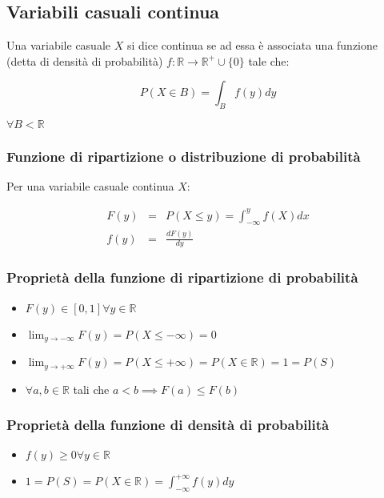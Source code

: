 \documentclass{subfiles}
\begin{document}
\subsection{Variabili casuali continua}

Una variabile casuale $X$ si dice continua se ad essa è associata una funzione (detta di densità di probabilità) $f: \mathbb{R} \to \mathbb{R}^+ \cup \{0\}$ tale che:

$$
P(X \in B) = \int_B f(y)dy
$$

\noindent
$\forall B < \mathbb{R}$

\subsubsection{Funzione di ripartizione o distribuzione di probabilità}

Per una variabile casuale continua $X$:

$$
\begin{matrix}
F(y) &=& P(X \leq y) = \int^y_{-\infty} f(X)dx \\
f(y) &=& \frac{dF(y)}{dy}
\end{matrix}
$$

\subsubsection{Proprietà della funzione di ripartizione di probabilità}

\begin{itemize}
    \item $F(y) \in [0,1] \forall y \in \mathbb{R}$
    \item $\lim_{y \to -\infty} F(y) = P(X \leq -\infty) = 0$
    \item $\lim_{y \to +\infty} F(y) = P(X \leq +\infty) = P(X \in \mathbb{R}) = 1 = P(S)$
    \item $\forall a,b \in \mathbb{R}$ tali che $a < b \implies F(a) \leq F(b)$
\end{itemize}

\subsubsection{Proprietà della funzione di densità di probabilità}

\begin{itemize}
    \item $f(y) \geq 0 \forall y \in \mathbb{R}$
    \item $1 = P(S) = P(X \in \mathbb{R}) = \int^{+\infty}_{-\infty} f(y)dy$
\end{itemize}
\end{document}
